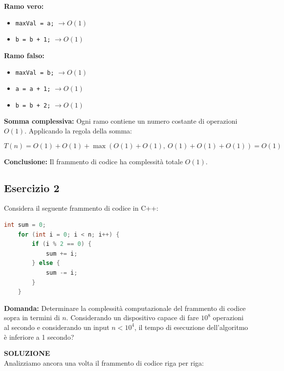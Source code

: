 \textbf{Ramo vero:}
\begin{itemize}
	\item \texttt{maxVal = a;} $\rightarrow O(1)$
	\item \texttt{b = b + 1;} $\rightarrow O(1)$
\end{itemize}

\textbf{Ramo falso:}
\begin{itemize}
	\item \texttt{maxVal = b;} $\rightarrow O(1)$
	\item \texttt{a = a + 1;} $\rightarrow O(1)$
	\item \texttt{b = b + 2;} $\rightarrow O(1)$
\end{itemize}

\textbf{Somma complessiva:}  
Ogni ramo contiene un numero costante di operazioni $O(1)$.  
Applicando la regola della somma:

\[
T(n) = O(1) + O(1) + \max(O(1)+O(1),\ O(1)+O(1)+O(1)) = O(1)
\]

\textbf{Conclusione:}  
Il frammento di codice ha complessità totale $O(1)$.







\subsection{Esercizio 2}
Considera il seguente frammento di codice in C++:

\begin{lstlisting}[language=C++]
	int sum = 0;
	for (int i = 0; i < n; i++) {
		if (i % 2 == 0) {
			sum += i;
		} else {
			sum -= i;
		}
	}
\end{lstlisting}

\textbf{Domanda:}  
Determinare la complessità computazionale del frammento di codice sopra in termini di $n$.
Considerando un dispositivo capace di fare $10^8$ operazioni al secondo e considerando un input $n <10^4$, il tempo di esecuzione dell'algoritmo è inferiore a 1 secondo?


\vspace{1cm}

\textbf{SOLUZIONE} \\

Analizziamo ancora una volta il frammento di codice riga per riga:

